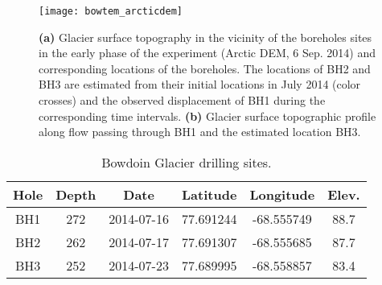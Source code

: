 \documentclass[utf8]{article}
\begin{document}
    \begin{figure}
      \centerline{\texttt{[image: bowtem\_arcticdem]}}
      \caption{\textbf{(a)} Glacier surface topography in the vicinity of the
               boreholes sites in the early phase of the experiment (Arctic
               DEM, 6 Sep. 2014) and corresponding locations of the boreholes.
               The locations of BH2 and BH3 are estimated from their initial
               locations in July 2014 (color crosses) and the observed
               displacement of BH1 during the corresponding time intervals.
               \textbf{(b)} Glacier surface topographic profile along flow
               passing through BH1 and the estimated location BH3.}
      \label{fig:arcticdem}
    \end{figure}


\clearpage

    \begin{table}[t]
      \caption{%
        Bowdoin Glacier drilling sites.}
      \label{tab:drilling}
      {\begin{tabular}{cccccc}
        \hline
        Hole & Depth & Date       & Latitude  & Longitude  & Elev. \\
        \hline
        BH1  & 272   & 2014-07-16 & 77.691244 & -68.555749 & 88.7 \\ %
        BH2  & 262   & 2014-07-17 & 77.691307 & -68.555685 & 87.7 \\ %
        BH3  & 252   & 2014-07-23 & 77.689995 & -68.558857 & 83.4 \\ %
        \hline
      \end{tabular}}
    \end{table}
\end{document}
